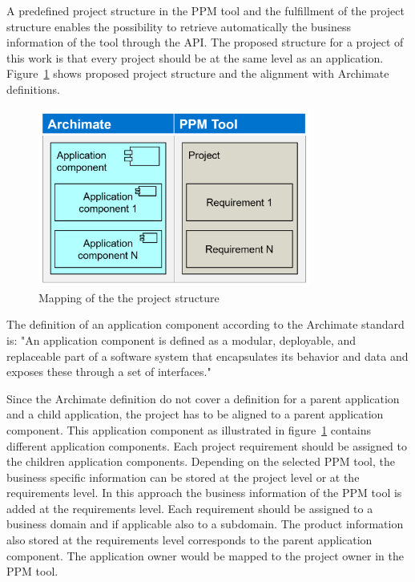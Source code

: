 A predefined project structure in the PPM tool and the fulfillment of the project structure enables the possibility to retrieve automatically the business information of the tool through the API. 
%
The proposed structure for a project of this work is that every project should be at the same level as an application. Figure~\ref{fig:project-structure-mapping} shows proposed project structure and the alignment with Archimate definitions.

\begin{figure}[htpb]
  \centering
  \includegraphics[width=0.8\textwidth]{figures/project-structure-mapping.PNG}
  \caption{Mapping of the the project structure}
  \label{fig:project-structure-mapping}
\end{figure}

The definition of an application component according to the Archimate standard is: "An application component is defined as a modular, deployable, and replaceable part of a software system that encapsulates its behavior and data and exposes these through a set of interfaces." \cite{vanderMerwe2013}

Since the Archimate definition do not cover a definition for a parent application and a child application, the project has to be aligned to a parent application component. This application component as illustrated in figure~\ref{fig:project-structure-mapping} contains different application components. Each project requirement should be assigned to the children application components. Depending on the selected PPM tool, the business specific information can be stored at the project level or at the requirements level. In this approach the business information of the PPM tool is added at the requirements level. Each requirement should be assigned to a business domain and if applicable also to a subdomain. The product information also stored at the requirements level corresponds to the parent application component. 
The application owner would be mapped to the project owner in the PPM tool.

